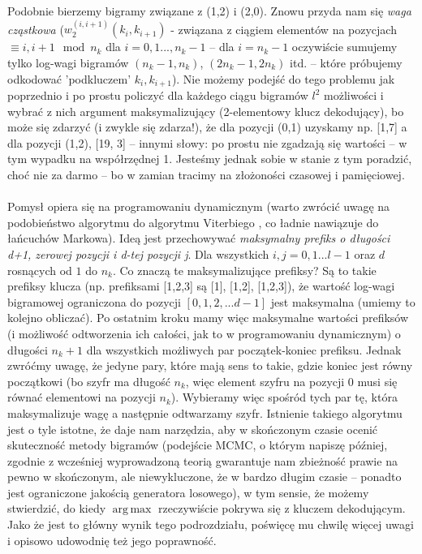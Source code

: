 \documentclass[a4paper]{article}
\DeclareMathOperator*{\argmax}{arg\,max}
\theoremstyle{defn}
\theoremstyle{theorem}
\theoremstyle{lemma}
\theoremstyle{cor}
\theoremstyle{fact}
\begin{document}
Podobnie bierzemy bigramy związane z (1,2) i (2,0). Znowu przyda nam się \textit{waga cząstkowa} ($w_2^{(i, i+1)}(k_i, k_{i+1})$ - związana z ciągiem elementów na pozycjach $\equiv i, i+1 \mod n_k$ dla $i=0,1...,n_k-1$ – dla $i=n_k-1$ oczywiście sumujemy tylko log-wagi bigramów $(n_k-1, n_k)$, $(2n_k-1, 2n_k)$ itd. – które próbujemy odkodować 'podkluczem' $k_i, k_{i+1}$). Nie możemy podejść do tego problemu jak poprzednio i po prostu policzyć dla każdego ciągu bigramów $l^2$ możliwości i wybrać z nich argument maksymalizujący (2-elementowy klucz dekodujący), bo może się zdarzyć (i zwykle się zdarza!), że dla pozycji (0,1) uzyskamy np. [1,7] a dla pozycji (1,2), [19, 3] – innymi słowy: po prostu nie zgadzają się wartości – w tym wypadku na współrzędnej 1. Jesteśmy jednak sobie w stanie z tym poradzić, choć nie za darmo – bo w zamian tracimy na złożoności czasowej i pamięciowej. \\\\
Pomysł opiera się na programowaniu dynamicznym (warto zwrócić uwagę na podobieństwo algorytmu do algorytmu Viterbiego \cite{viterbi}, co ładnie nawiązuje do łańcuchów Markowa). Ideą jest przechowywać \textit{maksymalny prefiks o długości d+1, zerowej pozycji i d-tej pozycji j}. Dla wszystkich $i,j=0,1...l-1$ oraz $d$ rosnących od $1$ do $n_k$. Co znaczą te maksymalizujące prefiksy? Są to takie prefiksy klucza (np. prefiksami [1,2,3] są [1], [1,2], [1,2,3]), że wartość log-wagi bigramowej ograniczona do pozycji $[0,1,2,...d-1]$ jest maksymalna (umiemy to kolejno obliczać). Po ostatnim kroku mamy więc maksymalne wartości prefiksów (i możliwość odtworzenia ich całości, jak to w programowaniu dynamicznym) o długości $n_k+1$ dla wszystkich możliwych par początek-koniec prefiksu. Jednak zwróćmy uwagę, że jedyne pary, które mają sens to takie, gdzie koniec jest równy początkowi (bo szyfr ma długość $n_k$, więc element szyfru na pozycji $0$ musi się równać elementowi na pozycji $n_k$). Wybieramy więc spośród tych par tę, która maksymalizuje wagę a następnie odtwarzamy szyfr. Istnienie takiego algorytmu jest o tyle istotne, że daje nam narzędzia, aby w skończonym czasie ocenić skuteczność metody bigramów (podejście MCMC, o którym napiszę później, zgodnie z wcześniej wyprowadzoną teorią gwarantuje nam zbieżność prawie na pewno w skończonym, ale niewykluczone, że w bardzo długim czasie – ponadto jest ograniczone jakością generatora losowego), w tym sensie, że możemy stwierdzić, do kiedy $\argmax$ rzeczywiście pokrywa się z kluczem dekodującym. Jako że jest to główny wynik tego podrozdziału, poświęcę mu chwilę więcej uwagi i opisowo udowodnię też jego poprawność.\\
\end{document}
